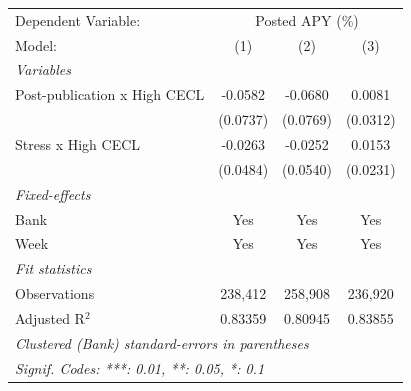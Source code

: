 
\begingroup
\centering
\begin{tabular}{lccc}
   \tabularnewline \midrule \midrule
   Dependent Variable: & \multicolumn{3}{c}{Posted APY (\%)}\\
   Model:                       & (1)      & (2)      & (3)\\  
   \midrule
   \emph{Variables}\\
   Post-publication x High CECL & -0.0582  & -0.0680  & 0.0081\\   
                                & (0.0737) & (0.0769) & (0.0312)\\   
   Stress x High CECL           & -0.0263  & -0.0252  & 0.0153\\   
                                & (0.0484) & (0.0540) & (0.0231)\\   
   \midrule
   \emph{Fixed-effects}\\
   Bank                         & Yes      & Yes      & Yes\\  
   Week                         & Yes      & Yes      & Yes\\  
   \midrule
   \emph{Fit statistics}\\
   Observations                 & 238,412  & 258,908  & 236,920\\  
   Adjusted R$^2$               & 0.83359  & 0.80945  & 0.83855\\  
   \midrule \midrule
   \multicolumn{4}{l}{\emph{Clustered (Bank) standard-errors in parentheses}}\\
   \multicolumn{4}{l}{\emph{Signif. Codes: ***: 0.01, **: 0.05, *: 0.1}}\\
\end{tabular}
\par\endgroup


